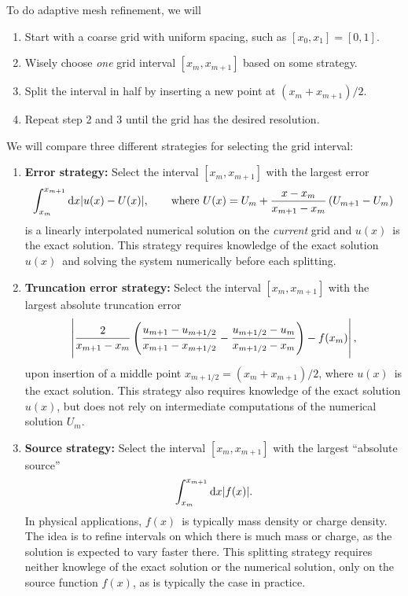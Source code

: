 To do adaptive mesh refinement, we will
\begin{enumerate}
\item Start with a coarse grid with uniform spacing, such as $[x_0, x_1] = [0, 1]$.
\item Wisely choose \emph{one} grid interval $[x_m, x_{m+1}]$ based on some strategy.
\item Split the interval in half by inserting a new point at $(x_m + x_{m+1}) / 2$.
\item Repeat step 2 and 3 until the grid has the desired resolution.
\end{enumerate}
We will compare three different strategies for selecting the grid interval:
\begin{enumerate}
\item \textbf{Error strategy:} Select the interval $[x_m, x_{m+1}]$ with the largest error
\begin{equation*}
\int_{x_m}^{x_{m+1}} \dif x |u(x) - U(x)|, \qquad \text{where} \,\, U(x) = U_m + \frac{x - x_m}{x_{m+1} - x_m} \left( U_{m+1} - U_m \right)
\end{equation*}
is a linearly interpolated numerical solution on the \emph{current} grid and $u(x)$ is the exact solution.
This strategy requires knowledge of the exact solution $u(x)$ and solving the system numerically before each splitting.

\item \textbf{Truncation error strategy:} Select the interval $[x_m, x_{m+1}]$ with the largest absolute truncation error
\begin{equation*}
\left| \frac{2}{x_{m+1}-x_{m}} \left( \frac{u_{m+1}-u_{m+1/2}}{x_{m+1}-x_{m+1/2}} - \frac{u_{m+1/2}-u_{m}}{x_{m+1/2}-x_{m}} \right) - f(x_m) \right|,
\end{equation*}
upon insertion of a middle point $x_{m+1/2} = (x_m + x_{m+1})/2$, where $u(x)$ is the exact solution.
This strategy also requires knowledge of the exact solution $u(x)$, but does not rely on intermediate computations of the numerical solution $U_m$.

\item \textbf{Source strategy:} Select the interval $[x_m, x_{m+1}]$ with the largest ``absolute source''
\begin{equation*}
\int_{x_m}^{x_{m+1}} \dif x |f(x)|.
\end{equation*}
In physical applications, $f(x)$ is typically mass density or charge density. 
The idea is to refine intervals on which there is much mass or charge, as the solution is expected to vary faster there.
This splitting strategy requires neither knowlege of the exact solution or the numerical solution, only on the source function $f(x)$, as is typically the case in practice.
\end{enumerate}

